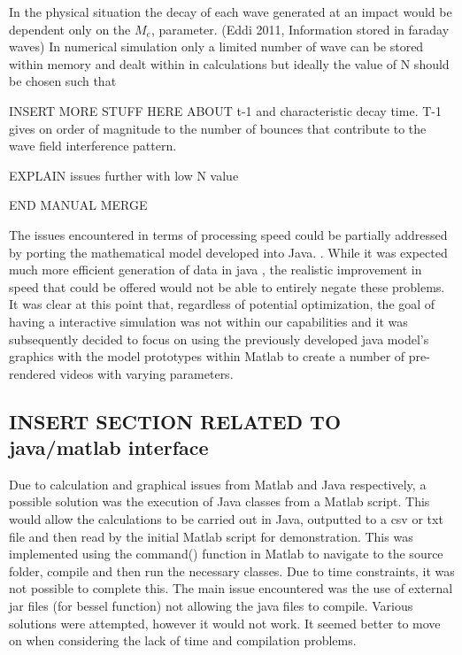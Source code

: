 In the physical situation the decay of each wave generated at an impact would be dependent only on the $M_e$, parameter. (Eddi 2011, Information stored in faraday waves)  In numerical simulation only a limited number of wave can be stored within memory and dealt within in calculations but ideally the value of N should be chosen such that 

INSERT MORE STUFF HERE ABOUT t-1 and characteristic decay time.
T-1 gives on order of magnitude to the number of bounces that contribute to the wave field interference pattern.

EXPLAIN issues further with low N value

END MANUAL MERGE

The issues encountered in terms of processing speed could be partially addressed by porting the mathematical model developed into Java. . While it was expected much more efficient generation of data in java , the realistic improvement in speed that could be offered would not be able to entirely negate these problems.
It was clear at this point that, regardless of potential optimization, the goal of having a interactive simulation was not within our capabilities and it was subsequently  decided to focus on using the previously developed java model's graphics with the model prototypes within Matlab to create a number of pre-rendered videos with varying parameters.
\subsection{INSERT SECTION RELATED TO java/matlab interface}

Due to calculation and graphical issues from Matlab and Java respectively, a possible solution was the execution of Java classes from a Matlab script. This would allow the calculations to be carried out in Java, outputted to a csv or txt file and then read by the initial Matlab script for demonstration. This was implemented using the command() function in Matlab to navigate to the source folder, compile and then run the necessary classes. Due to time constraints, it was not possible to complete this. The main issue encountered was the use of external jar files (for bessel function) not allowing the java files to compile. Various solutions were attempted, however it would not work. It seemed better to move on when considering the lack of time and compilation problems.


